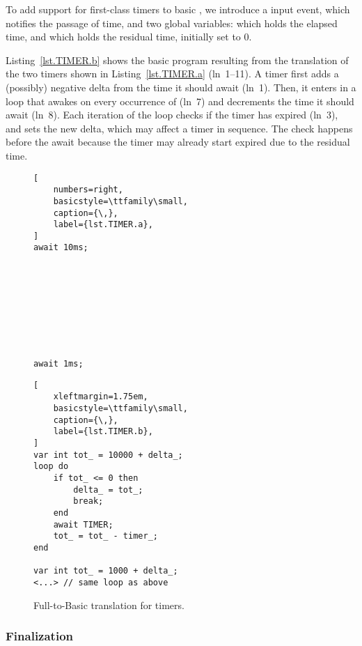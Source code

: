 To add support for first-class timers to basic \CEU , we introduce a
 input event, which notifies the passage of time, and two global
variables:  which holds the elapsed time, and 
which holds the residual time, initially set to 0.

Listing~\ref{lst.TIMER.b} shows the basic \CEU program resulting from the
translation of the two timers shown in Listing~\ref{lst.TIMER.a} (ln~1--11).
A timer first adds a (possibly) negative delta from the time it should await
(ln~1).  Then, it enters in a loop that awakes on every occurrence of
 (ln~7) and decrements the time it should await (ln~8).  Each
iteration of the loop checks if the timer has expired (ln~3), and sets the
new delta, which may affect a timer in sequence.  The check happens before
the await because the timer may already start expired due to the residual
time.

\begin{figure}[!ht]
\begin{minipage}[t]{0.33\linewidth}
\begin{lstlisting}[
    numbers=right,
    basicstyle=\ttfamily\small,
    caption={\,},
    label={lst.TIMER.a},
]
await 10ms;









await 1ms;

\end{lstlisting}
\end{minipage}
%
\begin{minipage}[t]{0.63\linewidth}
\begin{lstlisting}[
    xleftmargin=1.75em,
    basicstyle=\ttfamily\small,
    caption={\,},
    label={lst.TIMER.b},
]
var int tot_ = 10000 + delta_;
loop do
    if tot_ <= 0 then
        delta_ = tot_;
        break;
    end
    await TIMER;
    tot_ = tot_ - timer_;
end

var int tot_ = 1000 + delta_;
<...> // same loop as above
\end{lstlisting}
\end{minipage}
\caption{ Full-to-Basic translation for timers. }
\label{lst.TIMER}
\end{figure}

\subsubsection*{Finalization}

